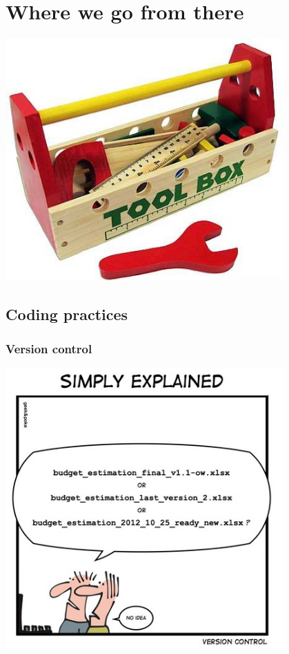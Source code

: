 \documentclass[14pt]{beamer}
\begin{document}
\section{Where we go from there}
\begin{frame}
\centering
\includegraphics[width=0.8\textwidth]{wooden_tool_box}

\end{frame}

\subsection{Coding practices}
\begin{frame}
\frametitle{Version control}
\centering
\includegraphics[width=0.8\textwidth]{Version-Control-Comic}

\end{frame}
\end{document}
